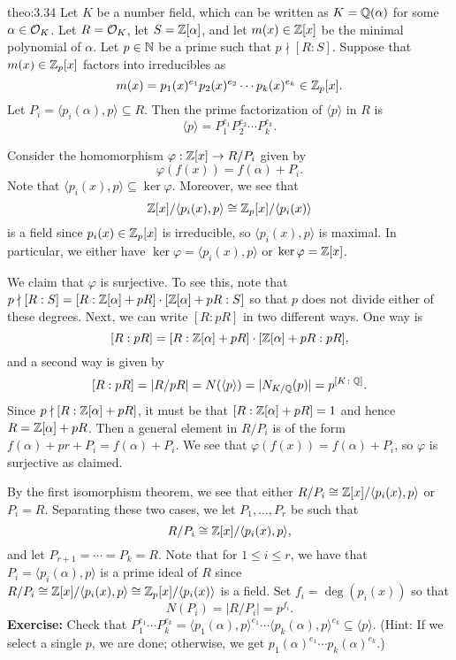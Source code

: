 \begin{theo}{theo:3.34}
    Let $K$ be a number field, which can be written as $K = \mathbb{Q}(\alpha)$ for some 
    $\alpha \in {\cal O}_K$. Let $R = {\cal O}_K$, let $S = \mathbb{Z}[\alpha]$, and let 
    $m(x) \in \mathbb{Z}[x]$ be the minimal polynomial of $\alpha$. Let $p \in \mathbb{N}$ 
    be a prime such that $p \nmid [R : S]$. Suppose that $m(x) \in \mathbb{Z}_p[x]$ factors 
    into irreducibles as 
    \[ m(x) = p_1(x)^{e_1} p_2(x)^{e_2} \cdots p_k(x)^{e_k} \in \mathbb{Z}_p[x]. \] 
    Let $P_i = \langle p_i(\alpha), p \rangle \subseteq R$. Then the prime 
    factorization of $\langle p \rangle$ in $R$ is 
    \[ \langle p \rangle = P_1^{e_1} P_2^{e_2} \cdots P_k^{e_k}. \] 
\end{theo}\vspace{-0.25cm}
\begin{pf}
    Consider the homomorphism $\varphi : \mathbb{Z}[x] \to R/P_i$ given by 
    \[ \varphi(f(x)) = f(\alpha) + P_i. \] 
    Note that $\langle p_i(x), p \rangle \subseteq \ker\varphi$. Moreover, we see that 
    \[ \mathbb{Z}[x]/\langle p_i(x), p \rangle \cong \mathbb{Z}_p[x]/\langle p_i(x) \rangle \] 
    is a field since $p_i(x) \in \mathbb{Z}_p[x]$ is irreducible, so $\langle p_i(x), p \rangle$ 
    is maximal. In particular, we either have $\ker\varphi = \langle p_i(x), p \rangle$ or 
    $\ker\varphi = \mathbb{Z}[x]$. 

    We claim that $\varphi$ is surjective. To see this, note that 
    $p \nmid [R : S] = [R : \mathbb{Z}[\alpha] + pR] \cdot [\mathbb{Z}[\alpha] + pR : S]$ 
    so that $p$ does not divide either of these degrees. Next, 
    we can write $[R : pR]$ in two different ways. One way is 
    \[ [R : pR] = [R : \mathbb{Z}[\alpha] + pR] \cdot [\mathbb{Z}[\alpha] + pR : pR], \] 
    and a second way is given by 
    \[ [R : pR] = |R/pR| = N(\langle p \rangle) = |N_{K/\mathbb{Q}}(p)| = p^{[K \colon \mathbb{Q}]}. \] 
    Since $p \nmid [R : \mathbb{Z}[\alpha] + pR]$, it must be that $[R : \mathbb{Z}[\alpha] + pR] = 1$ 
    and hence $R = \mathbb{Z}[\alpha] + pR$. 
    Then a general element in $R/P_i$ is of the form $f(\alpha) + pr + P_i = 
    f(\alpha) + P_i$. We see that $\varphi(f(x)) = f(\alpha) + P_i$,
    so $\varphi$ is surjective as claimed.

    By the first isomorphism theorem, we see that either 
    $R/P_i \cong \mathbb{Z}[x]/\langle p_i(x), p \rangle$ or $P_i = R$. 
    Separating these two cases, we let $P_1, \dots, P_r$ be such that 
    \[ R/P_i \cong \mathbb{Z}[x]/\langle p_i(x), p \rangle, \] 
    and let $P_{r+1} = \cdots = P_k = R$. Note that for $1 \leq i \leq r$, 
    we have that $P_i = \langle p_i(\alpha), p \rangle$ is a 
    prime ideal of $R$ since $R/P_i \cong \mathbb{Z}[x]/\langle p_i(x), p \rangle \cong 
    \mathbb{Z}_p[x]/\langle p_i(x) \rangle$ is a field. Set $f_i = \deg(p_i(x))$ so that 
    \[ N(P_i) = |R/P_i| = p^{f_i}. \] 
    {\bf Exercise:} Check that $P_1^{e_1} \cdots P_k^{e_k} = 
    \langle p_1(\alpha), p \rangle^{e_1} \cdots \langle p_k(\alpha), p \rangle^{e_k} 
    \subseteq \langle p \rangle$. 
    (Hint: If we select a single $p$, we are done; otherwise, we get $p_1(\alpha)^{e_1} 
    \cdots p_k(\alpha)^{e_k}$.)


\end{pf}
